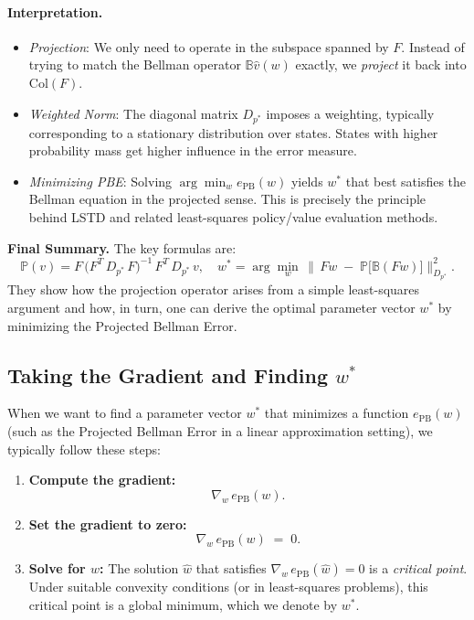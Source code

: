 \paragraph{Interpretation.}
\begin{itemize}
    \item \emph{Projection}: We only need to operate in the subspace spanned by $F$. Instead of trying to match the Bellman operator $\mathbb{B}\hat{v}(w)$ exactly, we \emph{project} it back into $\text{Col}(F)$.
    \item \emph{Weighted Norm}: The diagonal matrix $D_{p^*}$ imposes a weighting, typically corresponding to a stationary distribution over states. States with higher probability mass get higher influence in the error measure.
    \item \emph{Minimizing PBE}: Solving $\arg\min_w e_{\mathrm{PB}}(w)$ yields $w^*$ that best satisfies the Bellman equation in the projected sense. This is precisely the principle behind LSTD and related least-squares policy/value evaluation methods.
\end{itemize}

\noindent
\textbf{Final Summary.}  
The key formulas are:
\[
\boxed{
\mathbb{P}(v) 
= 
F \,\bigl(F^T\,D_{p^*}\,F\bigr)^{-1}\,F^T\,D_{p^*}\,v,
\quad
w^*
= 
\arg\min_{w}\,
\bigl\|\,
F w
\;-\;
\mathbb{P}\bigl[\mathbb{B}(F w)\bigr]
\bigr\|_{D_{p^*}}^2.
}
\]
They show how the projection operator arises from a simple least-squares argument and how, in turn, one can derive the optimal parameter vector $w^*$ by minimizing the Projected Bellman Error.

\subsection{Taking the Gradient and Finding \texorpdfstring{$w^*$}{w*}}

When we want to find a parameter vector \(w^*\) that minimizes a function \(e_{\mathrm{PB}}(w)\)
(such as the Projected Bellman Error in a linear approximation setting), we typically follow these steps:

\begin{enumerate}
    \item \textbf{Compute the gradient:} 
    \[
    \nabla_w \, e_{\mathrm{PB}}(w).
    \]
    \item \textbf{Set the gradient to zero:} 
    \[
    \nabla_w \, e_{\mathrm{PB}}(w) \;=\; 0.
    \]
    \item \textbf{Solve for \(w\):} 
    The solution \(\widehat{w}\) that satisfies \(\nabla_w \, e_{\mathrm{PB}}(\widehat{w}) = 0\)
    is a \emph{critical point}. Under suitable convexity conditions (or in least-squares problems),
    this critical point is a global minimum, which we denote by \(w^*\).
\end{enumerate}

